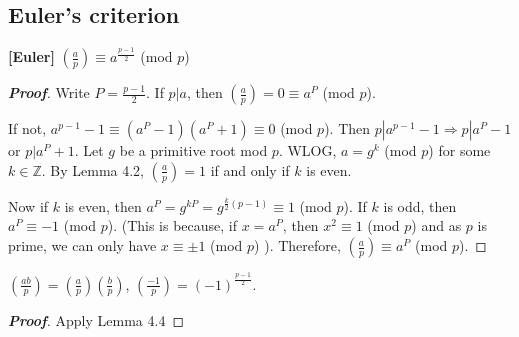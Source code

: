 \subsection{Euler's criterion}
\begin{lemma}{\bf [Euler]} $(\frac{a}{p}) \equiv a^{\frac{p-1}{2}}$ (mod $p$)
\end{lemma}
\begin{proof}[\bf Proof] Write $P=\frac{p-1}{2}$. If $p|a$, then $(\frac{a}{p})=0 \equiv a^{P}$ (mod $p$).

If not, $a^{p-1}-1 \equiv (a^P-1)(a^P+1) \equiv 0$ (mod $p$).
Then $p|a^{p-1}-1 \Rightarrow p|a^P-1$ or $p|a^P+1$. Let $g$ be a primitive root mod $p$. WLOG, $a=g^k$ (mod $p$) for some $k \in \mathbb{Z}$. By Lemma 4.2, $(\frac{a}{p})=1$ if and only if $k$ is even.

Now if $k$ is even, then $a^P=g^{kP}=g^{\frac{k}{2} (p-1)} \equiv 1$ (mod $p$). If $k$ is odd, then $a^P \equiv -1$ (mod $p$). (This is because, if $x=a^P$, then $x^2 \equiv 1$ (mod $p$) and as $p$ is prime, we can only have $x \equiv \pm 1$ (mod $p$) ). Therefore, $(\frac{a}{p}) \equiv a^P$ (mod $p$).
\end{proof}
\begin{corollary} $(\frac{ab}{p}) = (\frac{a}{p}) (\frac{b}{p})$,
$(\frac{-1}{p})=(-1)^{\frac{p-1}{2}}$.
\end{corollary}
\begin{proof}[\bf Proof] Apply Lemma 4.4
\end{proof}
